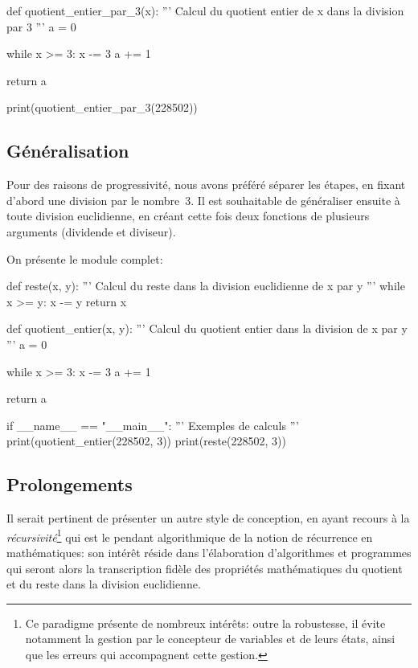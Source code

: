 \begin{python}[distribution3.py]
def quotient_entier_par_3(x):
	'''
	Calcul du quotient entier de x dans la division par 3
	'''
	a = 0
	
	while x >= 3:
		x -= 3
		a += 1
		
	return a
	
print(quotient_entier_par_3(228502))
\end{python}



\subsection{Généralisation}

Pour des raisons de progressivité, nous avons préféré séparer les étapes, en fixant d'abord une division par le nombre~$3$. Il est souhaitable de généraliser ensuite à toute division euclidienne, en créant cette fois deux fonctions de plusieurs arguments (dividende et diviseur).

On présente le module  complet:

\begin{python}[distribution4.py]
def reste(x, y):
	'''
	Calcul du reste dans la division euclidienne de x par y
	'''
	while x >= y:
		x -= y
	return x
	
def quotient_entier(x, y):
	'''
	Calcul du quotient entier dans la division de x par y
	'''
	a = 0
	
	while x >= 3:
		x -= 3
		a += 1
		
	return a

if __name__ == "__main__":
	'''
	Exemples de calculs
	'''
	print(quotient_entier(228502, 3))
	print(reste(228502, 3))
\end{python}


\subsection{Prolongements}

Il serait pertinent de présenter un autre style de conception, en ayant recours à la \emph{récursivité}\footnote{Ce paradigme présente de nombreux intérêts: outre la robustesse, il évite notamment la gestion par le concepteur de variables et de leurs états, ainsi que les erreurs qui accompagnent cette gestion.} qui est le pendant algorithmique de la notion de récurrence en mathématiques: son intérêt réside dans l'élaboration d'algorithmes et programmes qui seront alors la transcription fidèle des propriétés mathématiques du quotient et du reste dans la division euclidienne.

